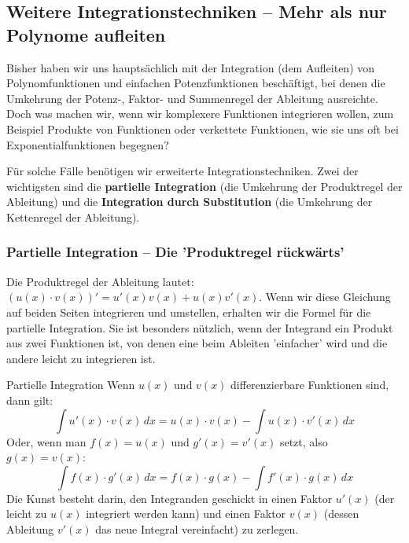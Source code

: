 
\subsection{Weitere Integrationstechniken – Mehr als nur Polynome aufleiten}
\label{subsec:integrationstechniken}

Bisher haben wir uns hauptsächlich mit der Integration (dem Aufleiten) von Polynomfunktionen und einfachen Potenzfunktionen beschäftigt, bei denen die Umkehrung der Potenz-, Faktor- und Summenregel der Ableitung ausreichte. Doch was machen wir, wenn wir komplexere Funktionen integrieren wollen, zum Beispiel Produkte von Funktionen oder verkettete Funktionen, wie sie uns oft bei Exponentialfunktionen begegnen?

Für solche Fälle benötigen wir erweiterte Integrationstechniken. Zwei der wichtigsten sind die \textbf{partielle Integration} (die Umkehrung der Produktregel der Ableitung) und die \textbf{Integration durch Substitution} (die Umkehrung der Kettenregel der Ableitung).

\subsubsection{Partielle Integration – Die 'Produktregel rückwärts'}
\label{subsubsec:partielle_integration}

Die Produktregel der Ableitung lautet: $(u(x) \cdot v(x))' = u'(x)v(x) + u(x)v'(x)$.
Wenn wir diese Gleichung auf beiden Seiten integrieren und umstellen, erhalten wir die Formel für die partielle Integration. Sie ist besonders nützlich, wenn der Integrand ein Produkt aus zwei Funktionen ist, von denen eine beim Ableiten 'einfacher' wird und die andere leicht zu integrieren ist.

\begin{merksatzumgebung}{Partielle Integration}
Wenn $u(x)$ und $v(x)$ differenzierbare Funktionen sind, dann gilt:
\[ \int u'(x) \cdot v(x) \,dx = u(x) \cdot v(x) - \int u(x) \cdot v'(x) \,dx \]
Oder, wenn man $f(x) = u(x)$ und $g'(x) = v'(x)$ setzt, also $g(x) = v(x)$:
\[ \int f(x) \cdot g'(x) \,dx = f(x) \cdot g(x) - \int f'(x) \cdot g(x) \,dx \]
Die Kunst besteht darin, den Integranden geschickt in einen Faktor $u'(x)$ (der leicht zu $u(x)$ integriert werden kann) und einen Faktor $v(x)$ (dessen Ableitung $v'(x)$ das neue Integral vereinfacht) zu zerlegen.
\end{merksatzumgebung}

